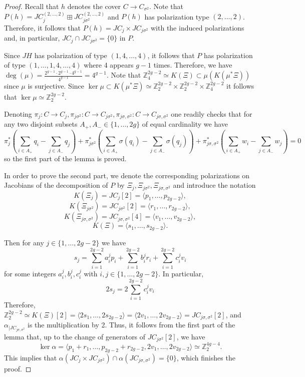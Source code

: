 \documentclass[10pt,a4paper]{amsart}
\newcommand{\s}{\sigma}
\begin{document}
\begin{proof}
    Recall that $h$ denotes the cover $C \to C_{\sigma^2}$. Note that $P(h) = JC_{j}^{(2,\ldots,2)} \boxplus JC_{j\sigma^2}^{(2,\ldots,2)}$ and $P(h)$ has polarization type $(2,\ldots,2)$. Therefore, it follows that $P(h) = JC_{j} \times JC_{j\sigma^2}$ with the induced polarizations and, in particular, $JC_{j} \cap JC_{j\sigma^2} = \{0\}$ in $P$.

    Since $JH$ has polarization of type $(1,4,\ldots, 4)$, it follows that $P$ has polarization of type $(1,\ldots, 1,4, \ldots, 4)$ where 4 appears $g-1$ times. Therefore, we have $\deg(\mu) = \frac{2^{g-1}\cdot 2^{g-1}\cdot 4^{g-1}}{4^{g-1}} = 4^{g-1}$. Note that $\mathbb{Z}_4^{2g-2} \simeq K(\Xi) \subset \mu(K(\mu^*\Xi))$ since $\mu$ is surjective. Since $\ker \mu \subset K(\mu^*\Xi) \simeq \mathbb{Z}_2^{2g-2} \times \mathbb{Z}_2^{2g-2} \times \mathbb{Z}_4^{2g-2}$
it follows that $\ker \mu \simeq \mathbb{Z}_2^{2g-2}$.

Denoting $\pi_j:C \to C_j, \pi_{j\sigma^2}: C \to C_{j\sigma^2}, \pi_{j\sigma, \sigma^2}: C \to C_{j\sigma, \sigma^2}$
    one readily checks that for any two disjoint subsets $A_+, A_- \in \{1,\ldots,2g\}$ of equal cardinality we have $$\pi_j^*\left(\sum_{i \in A_+} q_i - \sum_{j \in A_-} q_j\right) + \pi^*_{j\sigma^2}\left(\sum_{i \in A_+} \s(q_i) - \sum_{j \in A_-} \s(q_j)\right) + \pi_{j\sigma, \sigma^2}^*\left(\sum_{i \in A_+} w_i - \sum_{j \in A_-} w_j\right) = 0$$ so the first part of the lemma is proved. 

In order to prove the second part, we denote the corresponding polarizations on Jacobians of the decomposition of $P$ by $\Xi_{j}, \Xi_{j\sigma^2}, \Xi_{j\sigma,\sigma^2}$ and introduce the notation $$K(\Xi_{j}) = JC_{j}[2] = \langle p_1, \ldots, p_{2g-2} \rangle,$$
$$K(\Xi_{j\sigma^2}) = JC_{j\sigma^2}[2] = \langle r_1, \ldots, r_{2g-2} \rangle,$$
$$K(\Xi_{j\sigma, \sigma^2}) = JC_{j\s, \s^2}[4] = \langle v_1, \ldots, v_{2g-2} \rangle,$$
$$K(\Xi) =  \langle s_1, \ldots, s_{2g-2} \rangle.$$

Then for any $j \in \{1,\ldots, 2g-2\}$ we have $$s_j = \sum_{i=1}^{2g-2}a_i^jp_i + \sum_{i=1}^{2g-2}b_i^jr_i + \sum_{i=1}^{2g-2}c_i^jv_i$$ for some integers $a_i^j, b_i^j, c_i^j$ with $i, j \in \{1,\ldots, 2g-2\}$. In particular, $$2s_j =  2\sum_{i=1}^{2g-2}c_i^jv_i$$ Therefore, $\mathbb{Z}_2^{2g-2} \simeq K(\Xi)[2] = \langle 2s_1, \ldots, 2s_{2g-2}\rangle = \langle 2v_1, \ldots, 2v_{2g-2} \rangle = JC_{j\s, \s^2}[2]$, and $\alpha_{|JC_{j\s, \s^2}}$ is the multiplication by 2. Thus, it follows from the first part of the lemma that, up to the change of generators of $JC_{j\sigma^2}[2]$, we have  $$\ker \alpha = \langle p_1+r_1, \ldots, p_{2g-2}+r_{2g-2}, 2v_1, \ldots, 2v_{2g-2}\rangle \simeq \mathbb{Z}_2^{4g-4}.$$ This implies that $\alpha(JC_{j} \times JC_{j\s^2}) \cap \alpha(JC_{j\s,\s^2}) = \{0\}$, which finishes the proof.

\end{proof}
\end{document}
